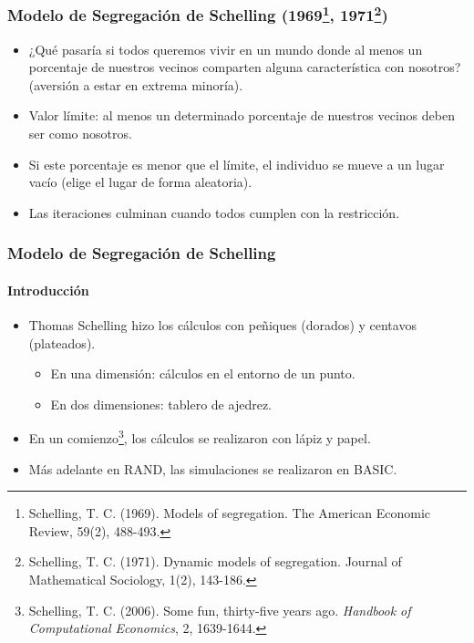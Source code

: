 \documentclass[11pt]{beamer}
\begin{document}
\begin{frame}
\frametitle{Modelo de Segregación de Schelling (1969\footnote{Schelling, T. C. (1969). Models of segregation. The American Economic Review, 59(2), 488-493.}, 1971\footnote{Schelling, T. C. (1971). Dynamic models of segregation. Journal of Mathematical Sociology, 1(2), 143-186.})}
\begin{itemize}
	\item ¿Qué pasaría si todos queremos vivir en un mundo donde al menos un porcentaje de nuestros vecinos comparten alguna característica con nosotros? (aversión a estar en extrema minoría).
	\item Valor límite: al menos un determinado porcentaje de nuestros vecinos deben ser como nosotros.
	\item Si este porcentaje es menor que el límite, el individuo se mueve a un lugar vacío (elige el lugar de forma aleatoria).
	\item Las iteraciones culminan cuando todos cumplen con la restricción.
	\end{itemize}
\end{frame}

\begin{frame}
\frametitle{Modelo de Segregación de Schelling}
\framesubtitle{Introducción}
\begin{itemize}
	\item Thomas Schelling hizo los cálculos con peñiques (dorados) y centavos (plateados).
	\begin{itemize}
		\item En una dimensión: cálculos en el entorno de un punto.
		\item En dos dimensiones: tablero de ajedrez.
	\end{itemize}
	\item En un comienzo\footnote{Schelling, T. C. (2006). Some fun, thirty-five years ago. \textit{Handbook of Computational Economics}, 2, 1639-1644.}, los cálculos se realizaron con lápiz y papel.
	\item Más adelante en RAND, las simulaciones se realizaron en BASIC.
\end{itemize}
\end{frame}
\end{document}
